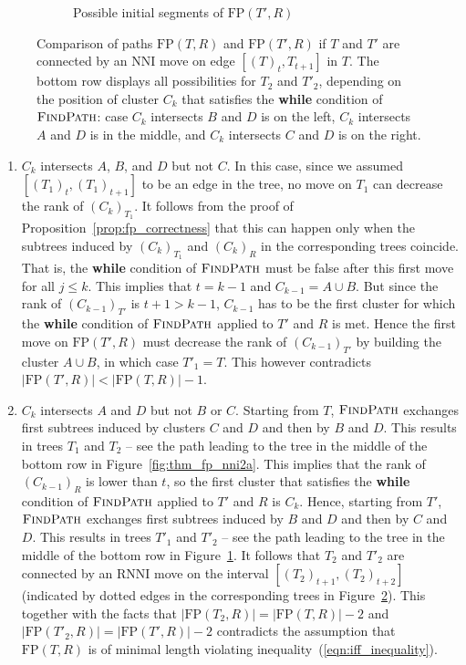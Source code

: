 \documentclass[11pt]{amsart}
\newcommand{\rnni}{\mathrm{RNNI}}
\newcommand{\findpath}{\textsc{FindPath}}
\newcommand{\nni}{\mathrm{NNI}}
\newcommand{\fp}{\mathrm{FP}}
\begin{document}
\begin{enumerate}[label = 1.{\arabic*}]
\begin{figure}[ht]
\begin{subfigure}[b]{.45\textwidth}
		\vspace{12pt}
		\caption{Possible initial segments of $\fp(T', R)$}
		\label{fig:thm_fp_nni2b}
	\end{subfigure}
	\caption{Comparison of paths $\fp(T, R)$ and $\fp(T', R)$ if $T$ and $T'$ are connected by an $\nni$ move on edge $[(T)_{t},T_{t+1}]$ in $T$.
	The bottom row displays all possibilities for $T_2$ and $T'_2$, depending on the position of cluster $C_k$ that satisfies the \textbf{while} condition of $\findpath$:
	case $C_k$ intersects $B$ and $D$ is on the left, $C_k$ intersects $A$ and $D$ is in the middle, and $C_k$ intersects $C$ and $ D$ is on the right.}
	\label{fig:thm_fp_nni}
\end{figure}

\begin{enumerate}[label = \theenumi.\arabic*]
\item $C_k$ intersects $A$, $B$, and $D$ but not $C$.
In this case, since we assumed $[(T_1)_t, (T_1)_{t+1}]$ to be an edge in the tree, no move on $T_1$ can decrease the rank of $(C_k)_{T_1}$.
It follows from the proof of Proposition~\ref{prop:fp_correctness} that this can happen only when the subtrees induced by $(C_k)_{T_1}$ and $(C_k)_R$ in the corresponding trees coincide.
That is, the \textbf{while} condition of $\findpath$ must be false after this first move for all $j \leq k$.
This implies that $t = k - 1$ and $C_{k-1} = A \cup B$.
But since the rank of $(C_{k-1})_{T'}$ is $t + 1 > k - 1$, $C_{k-1}$ has to be the first cluster for which the \textbf{while} condition of $\findpath$ applied to $T'$ and $R$ is met.
Hence the first move on $\fp(T', R)$ must decrease the rank of $(C_{k-1})_{T'}$ by building the cluster $A \cup B$, in which case $T'_1 = T$.
This however contradicts $|\fp(T',R)| < |\fp(T,R)| - 1$.

\item $C_k$ intersects $A$ and $D$ but not $B$ or $C$.
\label{deep_case_details}
Starting from $T$, $\findpath$ exchanges first subtrees induced by clusters $C$ and $D$ and then by $B$ and $D$.
This results in trees $T_1$ and $T_2$ -- see the path leading to the tree in the middle of the bottom row in Figure~\ref{fig:thm_fp_nni2a}.
This implies that the rank of $(C_{k-1})_R$ is lower than $t$, so the first cluster that satisfies the \textbf{while} condition of $\findpath$ applied to $T'$ and $R$ is $C_k$.
Hence, starting from $T'$, $\findpath$ exchanges first subtrees induced by $B$ and $D$ and then by $C$ and $D$.
This results in trees $T'_1$ and $T'_2$ -- see the path leading to the tree in the middle of the bottom row in Figure~\ref{fig:thm_fp_nni2b}.
It follows that $T_2$ and $T'_2$ are connected by an $\rnni$ move on the interval $[(T_2)_{t+1}, (T_2)_{t+2}]$ (indicated by dotted edges in the corresponding trees in Figure~\ref{fig:thm_fp_nni}).
This together with the facts that $|\fp(T_2, R)| = |\fp(T, R)| - 2$ and $|\fp(T'_2, R)| = |\fp(T', R)| - 2$ contradicts the assumption that $\fp(T, R)$ is of minimal length violating inequality~(\ref{eqn:iff_inequality}).


\end{enumerate}
\end{enumerate}
\end{document}
